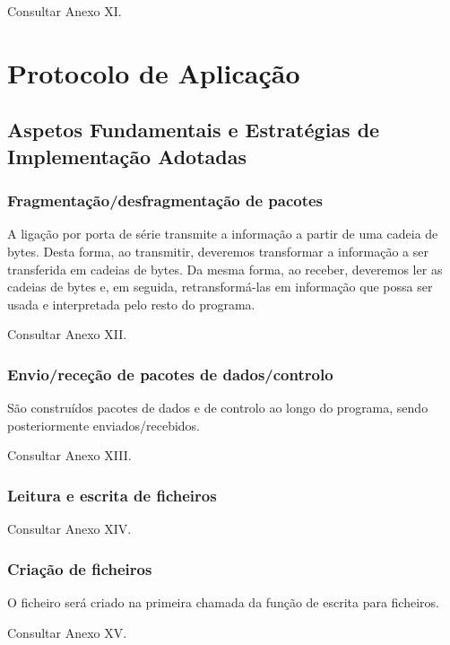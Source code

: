 \documentclass[article, a4paper, 11pt, oneside]{memoir}
\begin{document}
Consultar Anexo XI.

\chapter[Protocolo de Aplicação][Protocolo de Aplicação]{Protocolo de Aplicação} \label{\thechapter}

\section{Aspetos Fundamentais e Estratégias de Implementação Adotadas}

\subsection{Fragmentação/desfragmentação de pacotes}

A ligação por porta de série transmite a informação a partir de uma cadeia de bytes.
Desta forma, ao transmitir, deveremos transformar a informação a ser transferida em cadeias de bytes.
Da mesma forma, ao receber, deveremos ler as cadeias de bytes e, em seguida, retransformá-las em informação
que possa ser usada e interpretada pelo resto do programa.

Consultar Anexo XII.

\subsection{Envio/receção de pacotes de dados/controlo}
São construídos pacotes de dados e de controlo ao longo do programa, sendo posteriormente enviados/recebidos.

Consultar Anexo XIII.

\subsection{Leitura e escrita de ficheiros}
Consultar Anexo XIV.

\subsection{Criação de ficheiros}
O ficheiro será criado na primeira chamada da função de escrita para ficheiros.

Consultar Anexo XV.
\end{document}

